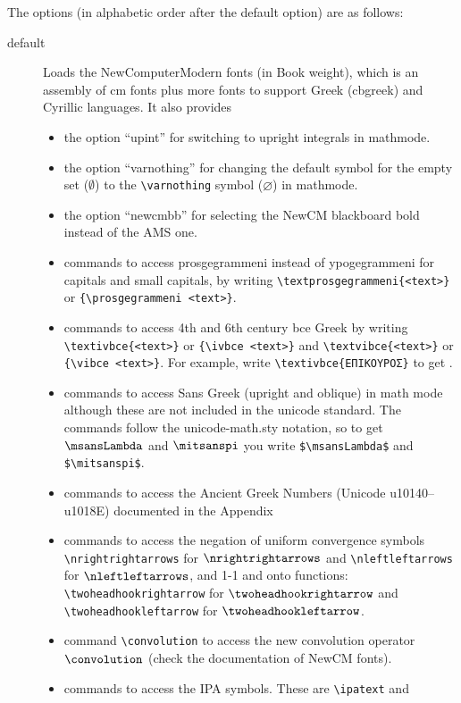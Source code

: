 \documentclass{book}
\begin{document}
  The options (in alphabetic order after the default option) are as follows:

  \begin{description}
  \item[default] Loads the NewComputerModern fonts (in Book weight),
    which is an assembly of cm fonts plus
    more fonts to support Greek (cbgreek) and Cyrillic languages. It also provides
    \begin{itemize}
    \item the option ``upint'' for switching to upright integrals in mathmode.
    \item the option ``varnothing'' for changing the default symbol for
      the empty set ($\emptyset$) to the \verb|\varnothing| symbol ($\varnothing$) in mathmode.
      \item the option ``newcmbb'' for selecting the NewCM blackboard bold instead of the AMS one.
      \item commands to access prosgegrammeni instead of ypogegrammeni for capitals and small
        capitals, by writing \verb|\textprosgegrammeni{<text>}| or \verb|{\prosgegrammeni <text>}|.
      \item commands to access 4th and 6th century bce Greek by writing
        \verb|\textivbce{<text>}| or \verb|{\ivbce <text>}| and
        \verb|\textvibce{<text>}| or \verb|{\vibce <text>}|. For example, write
        \verb|\textivbce{ΕΠΙΚΟΥΡΟΣ}| to get .
      \item commands to access Sans Greek (upright and oblique) in math mode although these are
        not included in the unicode standard. The commands follow the unicode-math.sty notation, so
        to get $\msansLambda$ and $\mitsanspi$ you write \verb|$\msansLambda$| and \verb|$\mitsanspi$|.
      \item commands to access the Ancient Greek Numbers (Unicode u10140--u1018E)
        documented in the Appendix
      \item commands to access the negation of uniform convergence symbols \verb|\nrightrightarrows|
        for $\nrightrightarrows$ and \verb|\nleftleftarrows| for $\nleftleftarrows$, and
        1-1 and onto functions: \verb|\twoheadhookrightarrow| for $\twoheadhookrightarrow$ and
        \verb|\twoheadhookleftarrow| for $\twoheadhookleftarrow$.
      \item command \verb|\convolution| to access the new convolution operator $\convolution$
        (check the documentation of NewCM fonts).
      \item commands to access the IPA symbols. These are \verb|\ipatext| and

\end{itemize}
\end{description}
\end{document}
